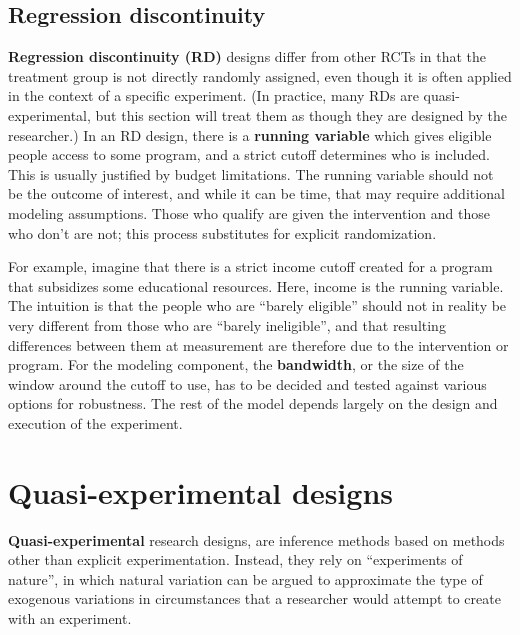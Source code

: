 \subsection{Regression discontinuity}

\textbf{Regression discontinuity (RD)} designs differ from other RCTs
in that the treatment group is not directly randomly assigned,
even though it is often applied in the context of a specific experiment.
(In practice, many RDs are quasi-experimental, but this section
will treat them as though they are designed by the researcher.)
In an RD design, there is a \textbf{running variable}
which gives eligible people access to some program,
and a strict cutoff determines who is included.\cite{lee2010regression}
This is usually justified by budget limitations.
The running variable should not be the outcome of interest,
and while it can be time, that may require additional modeling assumptions.
Those who qualify are given the intervention and those who don't are not;
this process substitutes for explicit randomization.

For example, imagine that there is a strict income cutoff created
for a program that subsidizes some educational resources.
Here, income is the running variable.
The intuition is that the people who are ``barely eligible''
should not in reality be very different from those who are ``barely ineligible'',
and that resulting differences between them at measurement
are therefore due to the intervention or program.\cite{imbens2008regression}
For the modeling component, the \textbf{bandwidth},
or the size of the window around the cutoff to use,
has to be decided and tested against various options for robustness.
The rest of the model depends largely on the design and execution of the experiment.


\section{Quasi-experimental designs}

\textbf{Quasi-experimental} research designs,
are inference methods based on methods other than explicit experimentation.
Instead, they rely on ``experiments of nature'',
in which natural variation can be argued to approximate
the type of exogenous variations in circumstances
that a researcher would attempt to create with an experiment.\cite{dinardo2016natural}


